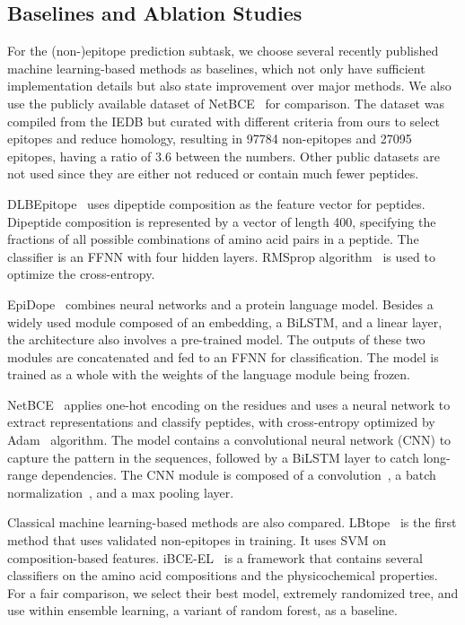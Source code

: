 \documentclass[runningheads]{llncs}
\begin{document}
\subsection{Baselines and Ablation Studies}
For the (non-)epitope prediction subtask, we choose several recently published machine learning-based methods as baselines, which not only have sufficient implementation details but also state improvement over major methods. We also use the publicly available dataset of NetBCE~\cite{xu2022netbce} for comparison. The dataset was compiled from the IEDB but curated with different criteria from ours to select epitopes and reduce homology, resulting in 97784 non-epitopes and 27095 epitopes, having a ratio of 3.6 between the numbers. Other public datasets are not used since they are either not reduced or contain much fewer peptides.

DLBEpitope~\cite{liu2020deep} uses dipeptide composition as the feature vector for peptides. Dipeptide composition is represented by a vector of length 400, specifying the fractions of all possible combinations of amino acid pairs in a peptide. The classifier is an FFNN with four hidden layers. RMSprop algorithm~\cite{graves2013generating} is used to optimize the cross-entropy.

EpiDope~\cite{collatz2021epidope} combines neural networks and a protein language model. Besides a widely used module composed of an embedding, a BiLSTM, and a linear layer, the architecture also involves a pre-trained model. The outputs of these two modules are concatenated and fed to an FFNN for classification. The model is trained as a whole with the weights of the language module being frozen.

NetBCE~\cite{xu2022netbce} applies one-hot encoding on the residues and uses a neural network to extract representations and classify peptides, with cross-entropy optimized by Adam~\cite{kingma2014adam} algorithm. The model contains a convolutional neural network (CNN) to capture the pattern in the sequences, followed by a BiLSTM layer to catch long-range dependencies. The CNN module is composed of a convolution~\cite{lecun1989backpropagation}, a batch normalization~\cite{ioffe2015batch}, and a max pooling layer.

Classical machine learning-based methods are also compared. LBtope~\cite{singh2013improved} is the first method that uses validated non-epitopes in training. It uses SVM on composition-based features. iBCE-EL~\cite{manavalan2018ibce} is a framework that contains several classifiers on the amino acid compositions and the physicochemical properties. For a fair comparison, we select their best model, extremely randomized tree, and use within ensemble learning, a variant of random forest, as a baseline.
\end{document}
